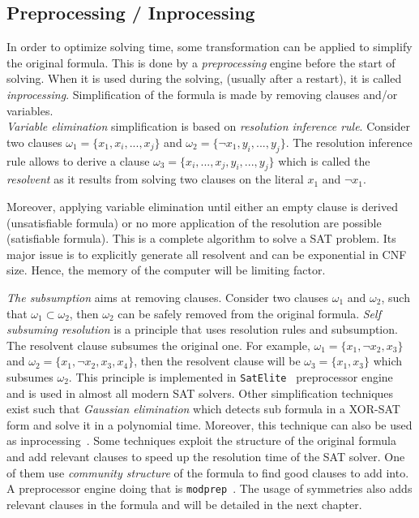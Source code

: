\subsection{Preprocessing / Inprocessing}
In order to optimize solving time, some transformation can be applied to simplify the original formula.
This is done by a \emph{preprocessing} engine before the start of solving.
When it is used during the solving, (usually after a restart), it is called \emph{inprocessing}.
Simplification of the formula is made by removing clauses and/or variables.\\

\emph{Variable elimination} simplification is based on \emph{resolution inference rule}.
Consider two clauses $\omega_1 = \{x_1, x_i, ..., x_j \}$ and $\omega_2 = \{\neg x_1, y_i, ..., y_j\}$.
The resolution inference rule allows to derive a clause $\omega_3 = \{x_i, ..., x_j, y_i, ..., y_j\}$ which is called
the \emph{resolvent} as it results from solving two clauses on the literal $x_1$ and $\neg x_1$.

Moreover,  applying variable elimination until either an empty clause is derived (unsatisfiable formula) or 
no more application of the resolution are possible (satisfiable formula). This is a complete algorithm to solve a SAT problem.
Its major issue is to explicitly generate all resolvent and can be exponential in CNF size.
Hence, the memory of the computer will be limiting factor.

\emph{The subsumption} aims at removing  clauses. Consider two clauses $\omega_1$ and $\omega_2$, such that
$\omega_1 \subset  \omega_2$, then $\omega_2$ can be safely removed from the original formula.
\emph{Self subsuming resolution} is a principle that uses resolution rules and subsumption.
The resolvent clause subsumes the original one. For example, $\omega_1 = \{x_1, \neg x_2, x_3\}$ and $\omega_2 = \{x_1, \neg x_2, x_3, x_4\}$,
 then the resolvent clause will be $\omega_3 = \{x_1, x_3\}$ which subsumes $\omega_2$. This principle
is implemented in \texttt{SatElite}~\cite{een2005effective} preprocessor engine and is used in almost all modern SAT solvers.
Other simplification techniques exist such that \emph{Gaussian elimination} which detects sub formula in a XOR-SAT
form and solve it in a polynomial time. Moreover, this technique can also be used as inprocessing~\cite{soos2010enhanced}. 
Some techniques exploit the structure of the original formula and add relevant clauses to speed up the resolution
time of the SAT solver. One of them use \textit{community structure} of the formula to find good clauses to add into.
A preprocessor engine doing that is  \texttt{modprep}~\cite{ansotegui2015using}.
The usage of symmetries also adds relevant clauses in the formula and will be detailed in the next chapter.

